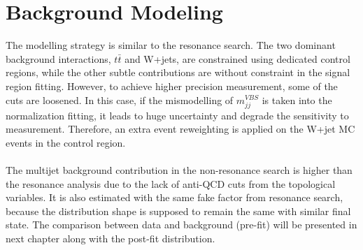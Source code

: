 \section{Background Modeling}
The  modelling strategy is similar to the resonance search. The two dominant background interactions, $t\bar{t}$ and W+jets, are constrained using dedicated control regions, while the other subtle contributions are without constraint in the signal region fitting. However, to achieve higher precision measurement, some of the cuts are loosened. In this case, if the mismodelling of $m^{VBS}_{jj}$ is taken into the normalization fitting, it leads to huge uncertainty and degrade the sensitivity to measurement. Therefore, an extra event reweighting is applied on the W+jet MC events in the control region.
\\
\\The multijet background contribution in the non-resonance search is higher than the resonance analysis due to the lack of anti-QCD cuts from the topological variables. It is also estimated with the same fake factor from resonance search, because the distribution shape is supposed to remain the same with similar final state. The comparison between data and background (pre-fit) will be presented in next chapter along with the post-fit distribution. 
